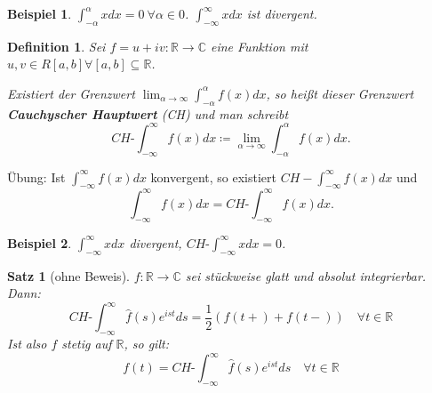 \documentclass[12pt]{extreport} %
\newcommand{\C}{\mathbb{C}}
\newcommand{\R}{\mathbb{R}}
\theoremstyle{named}
\theoremstyle{nnamed}
\theoremstyle{itshape}
\newtheorem{satz}[unnamedtheorem]{Satz}
\newtheorem*{definition}{Definition}
\theoremstyle{normal}
\newtheorem*{beispiel*}{Beispiel}
\begin{document}
\begin{beispiel*}
	$\int_{-\alpha}^{\alpha} x dx = 0 ~\forall \alpha \in 0$. $\int_{-\infty}^{\infty} x dx$ ist divergent.	
\end{beispiel*}

\begin{definition}
	Sei $f = u + iv \colon \R \rightarrow \C$ eine Funktion mit $u, v \in R[a, b] \forall [a, b] \subseteq \R$. 
	
	\bigskip
	
	Existiert der Grenzwert $\lim_{\alpha \rightarrow \infty} \int_{-\alpha}^{\alpha} f(x) dx$, so hei{\ss}t dieser Grenzwert \textbf{Cauchyscher Hauptwert} (CH) und man schreibt
	$$ CH \text{-} \int_{-\infty}^{\infty} f(x) dx \coloneqq \lim_{\alpha \rightarrow \infty} \int_{-\alpha}^{\alpha} f(x) dx. $$
\end{definition}


Übung: Ist $\int_{-\infty}^{\infty} f(x) dx$ konvergent, so existiert $CH-\int_{-\infty}^{\infty} f(x) dx$ und 
$$ \int_{-\infty}^{\infty} f(x) dx = CH \text{-} \int_{-\infty}^{\infty} f(x) dx. $$

\begin{beispiel*}
	$\int_{-\infty}^{\infty} x dx$ divergent, $CH\text{-}\int_{-\infty}^{\infty} x dx = 0$.	
\end{beispiel*}

\begin{satz}[ohne Beweis] \label{24.4:satz}
	$f \colon \R \rightarrow \C$ sei stückweise glatt und absolut integrierbar. Dann:
	$$ CH\text{-}\int_{-\infty}^{\infty} \hat{f}(s) e^{ist} ds = \frac{1}{2} \left( f(t+) + f(t-) \right) \quad \forall t \in \R $$
	Ist also $f$ stetig auf $\R$, so gilt:
	$$ f(t) = CH\text{-}\int_{-\infty}^{\infty} \hat{f}(s) e^{ist} ds \quad \forall t \in \R $$
\end{satz}
\end{document}

